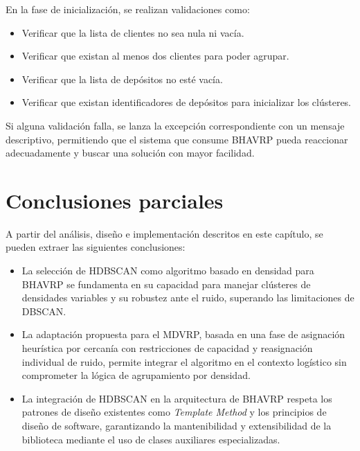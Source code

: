En la fase de inicialización, se realizan validaciones como:
\begin{itemize}
    \item Verificar que la lista de clientes no sea nula ni vacía.
    \item Verificar que existan al menos dos clientes para poder agrupar.
    \item Verificar que la lista de depósitos no esté vacía.
    \item Verificar que existan identificadores de depósitos para inicializar los clústeres.
\end{itemize}

Si alguna validación falla, se lanza la excepción correspondiente con un mensaje descriptivo, permitiendo que el sistema que consume BHAVRP pueda reaccionar adecuadamente y buscar una solución con mayor facilidad.

\clearpage

\section{Conclusiones parciales}

A partir del análisis, diseño e implementación descritos en este capítulo, se pueden extraer las siguientes conclusiones:

\begin{itemize}
  \item La selección de HDBSCAN como algoritmo basado en densidad para BHAVRP se fundamenta en su capacidad para manejar clústeres de densidades variables y su robustez ante el ruido, superando las limitaciones de DBSCAN.
  \item La adaptación propuesta para el MDVRP, basada en una fase de asignación heurística por cercanía con restricciones de capacidad y reasignación individual de ruido, permite integrar el algoritmo en el contexto logístico sin comprometer la lógica de agrupamiento por densidad.
  \item La integración de HDBSCAN en la arquitectura de BHAVRP respeta los patrones de diseño existentes como \textit{Template Method} y los principios de diseño de software, garantizando la mantenibilidad y extensibilidad de la biblioteca mediante el uso de clases auxiliares especializadas.
\end{itemize}